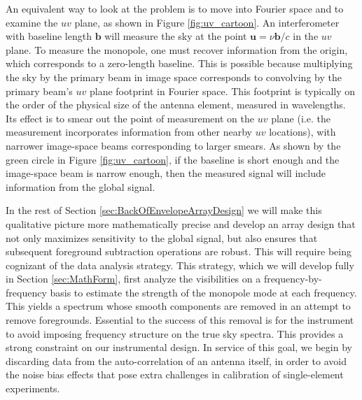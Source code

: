 \documentclass[twocolumn,apj,numberedappendix]{emulateapj}
\def\b{\mathbf{b}}
\begin{document}
An equivalent way to look at the problem is to move into Fourier space and to examine the $uv$ plane, as shown in Figure \ref{fig:uv_cartoon}. An interferometer with baseline length $\b$ will measure the sky at the point $\mathbf{u} = \nu\b/c$ in the $uv$ plane. To measure the monopole, one must recover information from the origin, which corresponds to a zero-length baseline. This is possible because multiplying the sky by the primary beam in image space corresponds to convolving by the primary beam's $uv$ plane footprint in Fourier space. This footprint is typically on the order of the physical size of the antenna element, measured in wavelengths. Its effect is to smear out the point of measurement on the $uv$ plane (i.e. the measurement incorporates information from other nearby $uv$ locations), with narrower image-space beams corresponding to larger smears. As shown by the green circle in Figure \ref{fig:uv_cartoon}, if the baseline is short enough and the image-space beam is narrow enough, then the measured signal will include information from the global signal. 

In the rest of Section \ref{sec:BackOfEnvelopeArrayDesign} we will make this qualitative picture more mathematically precise and develop an array design that not only maximizes sensitivity to the global signal, but also ensures that subsequent foreground subtraction operations are robust. This will require being cognizant of the data analysis strategy. This strategy, which we will develop fully in Section \ref{sec:MathForm}, first analyze the visibilities on a frequency-by-frequency basis to estimate the strength of the monopole mode at each frequency. This yields a spectrum whose smooth components are removed in an attempt to remove foregrounds. Essential to the success of this removal is for the instrument to avoid imposing frequency structure on the true sky spectra. This provides a strong constraint on our instrumental design. In service of this goal, we begin by discarding data from the auto-correlation of an antenna itself, in order to avoid the noise bias effects that pose extra challenges in calibration of single-element experiments.
 
\end{document}
